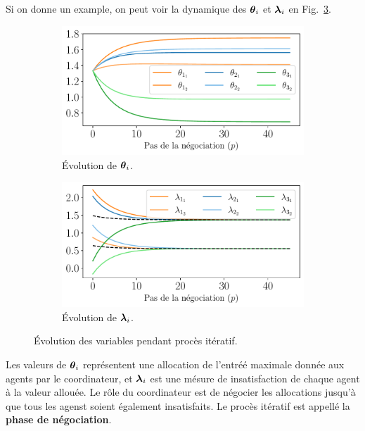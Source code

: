 \documentclass[../main.tex]{subfiles}
\begin{document}
Si on donne un example, on peut voir la dynamique des $\boldsymbol{\theta}_{i}$ et $\boldsymbol{\lambda}_{i}$ en Fig.~\ref{fig:example_variables_fr}.
\begin{figure}[h]
  \centering
  \begin{subfigure}{0.45\textwidth}
    \includegraphics[width=\textwidth]{../img/example_primal_decomposition/example_theta_fr.pdf}
    \caption{Évolution de $\boldsymbol{\theta}_{i}$.}\label{fig:example_theta_fr}
  \end{subfigure}
  \hfill
  \begin{subfigure}{0.45\textwidth}
    \centering
    \includegraphics[width=\textwidth]{../img/example_primal_decomposition/example_lambda_fr.pdf}
    \caption{Évolution de $\boldsymbol{\lambda}_{i}$.}\label{fig:example_lambda_fr}
  \end{subfigure}
    \caption{Évolution des variables pendant procès itératif.}\label{fig:example_variables_fr}
\end{figure}

Les valeurs de $\boldsymbol{\theta}_{i}$ représentent une allocation de l'entréé maximale donnée aux agents par le coordinateur, et $\boldsymbol{\lambda}_{i}$ est une mésure de insatisfaction de chaque agent à la valeur allouée.
Le rôle du coordinateur est de négocier les allocations jusqu'à que tous les agenst soient également insatisfaits.
Le procès itératif est appellé la \textbf{phase de négociation}.
\end{document}
